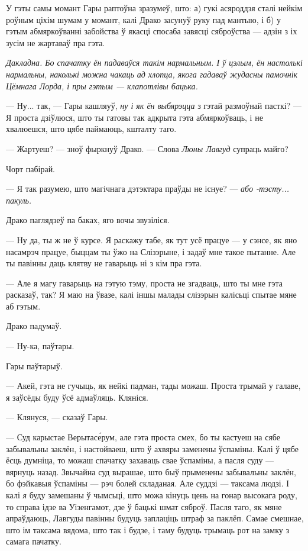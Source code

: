 У гэты самы момант Гары раптоўна зразумеў, што: а) гукі асяроддзя сталі нейкім
роўным ціхім шумам у момант, калі Драко засунуў руку пад мантыю, і б) 
у гэтым абмяркоўванні забойства ў якасці спосаба завясці сяброўства --- адзін 
з іх зусім не жартаваў пра гэта.

\emph{Дакладна. Бо спачатку ён падаваўся такім нармальным. І ў цэлым, ён настолькі 
нармальны, наколькі можна чакаць ад хлопца, якога гадаваў жудасны памочнік 
Цёмнага Лорда, і пры гэтым --- клапотлівы бацька.}

--- Ну... так, --- Гары кашляуў, \emph{ну і як ён выбярэцца} з гэтай размоўнай пасткі? --- 
Я проста дзіўлюся, што ты гатовы так адкрыта гэта абмяркоўваць, і не хвалюешся, 
што цябе паймаюць, кшталту таго.

--- Жартуеш? --- зноў фыркнуў Драко. --- Слова  \emph{Люны Лавгуд} супраць майго?

Чорт пабірай.

--- Я так разумею, што магічнага дэтэктара праўды не існуе? --- \emph{або
-тэсту... пакуль.}

Драко паглядзеў па баках, яго вочы звузіліся.

--- Ну да, ты ж не ў курсе. Я раскажу табе, як тут усё працуе --- у сэнсе, 
як яно насамрэч працуе, быццам ты ўжо на Слізэрыне, і задаў мне такое пытанне.
Але ты павінны даць клятву не гаварыць ні з кім пра гэта.

--- Але я магу гаварыць на гэтую тэму, проста не згадваць, што ты мне гэта расказаў, 
так? Я маю на ўвазе, калі іншы малады слізэрын калісьці спытае мяне аб гэтым.

Драко падумаў.

--- Ну-ка, паўтары.

Гары паўтарыў.

--- Акей, гэта не гучыць, як нейкі падман, тады можаш. Проста трымай у галаве, 
я заўсёды буду ўсё адмаўляць. Кляніся.

--- Клянуся, --- сказаў Гары.

--- Суд карыстае Верытас\'ерум, але гэта проста смех, бо ты кастуеш на сябе
забывальны заклён, і настойваеш, што ў ахвяры заменены ўспаміны. 
Калі ў цябе ёсць думніца, то можаш спачатку захаваць свае ўспаміны, а пасля 
суду --- вярнуць назад. Звычайна суд вырашае, што быў прыменены забывальны 
заклён, бо фэйкавыя ўспаміны --- рэч болей складаная. Але суддзі ---
таксама людзі. І калі \emph{я} буду замешаны ў чымсьці, што можа кінуць 
цень на гонар высокага роду, то справа ідзе ва Уізенгамот, дзе ў бацькі
шмат сяброў. Пасля таго, як мяне апраўдаюць, Лавгуды павінны будуць заплаціць 
штраф за паклёп. Самае смешнае, што ім таксама вядома, што так і будзе,
і таму будуць трымаць рот на замку з самага пачатку.

